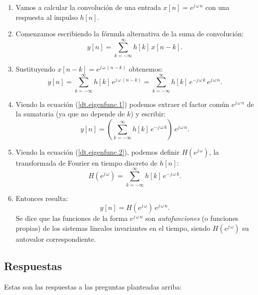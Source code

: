 \documentclass[11pt,a4paper,openany]{book}
\begin{document}
\begin{enumerate}
	\item Vamos a calcular la convolución de una entrada $x[n] = e^{j \, \omega \, n}$ con una respuesta al impulso $h[n]$.
	\item Comenzamos escribiendo la fórmula alternativa de la suma de convolución:
	\begin{equation}
		y[n] = \sum_{k=-\infty}^{\infty} h[k] \, x[n-k].
	\end{equation}
	\item Sustituyendo $x[n - k] =  e^{j \, \omega \, (n-k)}$ obtenemos:
	\begin{equation}
		y[n] = \sum_{k=-\infty}^{\infty} h[k] \, e^{j \, \omega \, (n-k)} = \sum_{k=-\infty}^{\infty} h[k] \, e^{-j \, \omega \, k} \, e^{j \, \omega \, n}. \label{dt.eigenfunc.1}
	\end{equation}
	\item Viendo la ecuación (\ref{dt.eigenfunc.1}) podemos extraer el factor común $e^{j \, \omega \, n}$ de la sumatoria (ya que no depende de $k$) y escribir:
	\begin{equation}
		y[n] = \left(\sum_{k=-\infty}^{\infty} h[k] \, e^{-j \, \omega \, k}\right) \, e^{j \, \omega \, n}. \label{dt.eigenfunc.2}
	\end{equation}
	\item Viendo la ecuación (\ref{dt.eigenfunc.2}), podemos definir $H(e^{j \, \omega})$, la transformada de Fourier en tiempo discreto de $h[n]$:
	\begin{equation}
		H(e^{j \, \omega}) = \sum_{k=-\infty}^{\infty} h[k] \, e^{-j \, \omega \, k}. \label{dt.eigenfunc.3}
	\end{equation}	 
	\item Entonces resulta:
	\begin{equation}
		y[n] = H(e^{j \, \omega}) \, e^{j \, \omega \, n}.
	\end{equation}
	Se dice que las funciones de la forma $e^{j \, \omega \, n}$ son \textit{autofunciones} (o funciones propias) de los sistemas lineales invariantes en el tiempo, siendo $H(e^{j \, \omega})$ su autovalor correspondiente.
\end{enumerate}  

\subsection{Respuestas}

Estas son las respuestas a las preguntas planteadas arriba:
\end{document}
